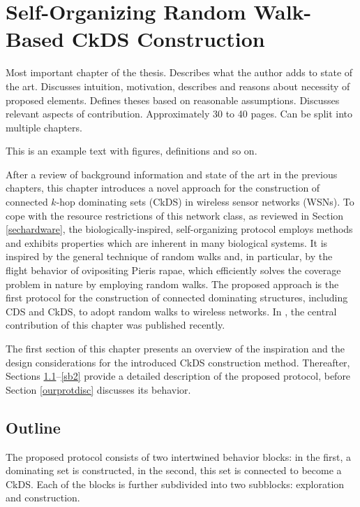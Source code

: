 \chapter{Self-Organizing Random Walk-Based CkDS Construction}

Most important chapter of the thesis. Describes what the author adds to state of the art. Discusses intuition, motivation, describes and reasons about necessity of proposed elements. Defines theses based on reasonable assumptions. Discusses relevant aspects of contribution. Approximately 30 to 40 pages. Can be split into multiple chapters.

This is an example text with figures, definitions and so on.

\label{bickds}

After a review of background information and state of the art in the previous chapters, this chapter introduces a novel approach for the construction of connected $k$-hop dominating sets (CkDS) in wireless sensor networks (WSNs). To cope with the resource restrictions of this network class, as reviewed in Section \ref{sechardware}, the biologically-inspired, self-organizing protocol employs methods and exhibits properties which are inherent in many biological systems. It is inspired by the general technique of random walks and, in particular, by the flight behavior of ovipositing Pieris rapae, which efficiently solves the coverage problem in nature by employing random walks. The proposed approach is the first protocol for the construction of connected dominating structures, including CDS and CkDS, to adopt random walks to wireless networks. In \cite{own092}, the central contribution of this chapter was published recently.



The first section of this chapter presents an overview of the inspiration and the design considerations for the introduced CkDS construction method. Thereafter, Sections \ref{bickds_sec_outline}--\ref{sb2} provide a detailed description of the proposed protocol, before Section \ref{ourprotdisc} discusses its behavior.



\section{Outline}\label{bickds_sec_outline}    \label{ourprot}\label{sec_o} \label{core}

The proposed protocol consists of two intertwined behavior blocks: in the first, a dominating set is constructed, in the second, this set is connected to become a CkDS. Each of the blocks is further subdivided into two subblocks: exploration and construction.  

